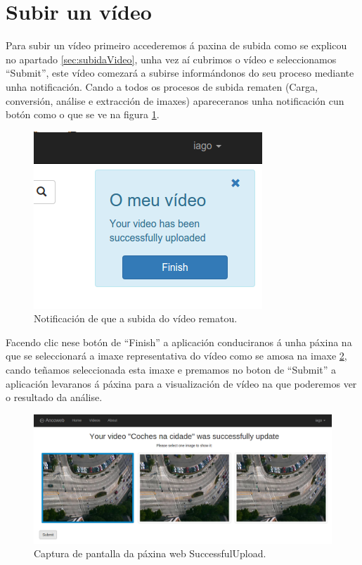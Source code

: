 \documentclass[11pt, a4paper, twoside, titlepage]{book}
\begin{document}
    \section{Subir un vídeo}
    
    Para subir un vídeo primeiro accederemos á paxina de subida como se explicou no apartado 
    \ref{sec:subidaVideo}, unha vez aí cubrimos o vídeo e seleccionamos ``Submit'', este vídeo comezará
    a subirse informándonos do seu proceso mediante unha notificación. Cando a todos os procesos de
    subida rematen (Carga, conversión, análise e extracción de imaxes) apareceranos unha 
    notificación cun botón como o que se ve na figura \ref{fig:notFinished}.
    
    \begin{figure}[htp]
    \begin{center}
        \includegraphics[scale=0.6]{figures/notFinished.png}
        \caption{Notificación de que a subida do vídeo rematou.}
    \label{fig:notFinished}
    \end{center}
    \end{figure}
    
    Facendo clic nese botón de ``Finish'' a aplicación conduciranos á unha páxina na que se 
    seleccionará a imaxe representativa do vídeo como se amosa na imaxe 
    \ref{fig:SuccessfulUploadScreen}, cando teñamos seleccionada esta imaxe e premamos no boton de 
    ``Submit'' a aplicación levaranos á páxina para a visualización de vídeo na que poderemos ver o 
    resultado da análise.
    
    \begin{figure}[htp]
    \begin{center}
        \includegraphics[scale=0.35]{figures/SuccessfulUploadScreen.png}
        \caption{Captura de pantalla da páxina web SuccessfulUpload.}
    \label{fig:SuccessfulUploadScreen}
    \end{center}
    \end{figure}
    
\end{document}
